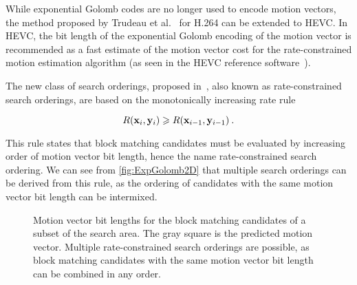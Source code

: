 \documentclass{article}
\newcommand{\beq}{\begin{dmath}}
\newcommand{\eeq}{\end{dmath}}
\newcommand{\vx}{\mathbf{x}}
\newcommand{\vy}{\mathbf{y}}
\begin{document}
While exponential Golomb codes are no longer used to encode motion vectors, the method proposed by Trudeau et al.~\cite{Trud14} for H.264 can be extended to HEVC. In HEVC, the bit length of the exponential Golomb encoding of the motion vector is recommended as a fast estimate of the motion vector cost for the rate-constrained motion estimation algorithm (as seen in the HEVC reference software~\cite{McCann2014}).

The new class of search orderings, proposed in~\cite{Trud14}, also known as rate-constrained search orderings, are based on the monotonically increasing rate rule

\beq
\small
R(\vx_i, \vy_i) \geqslant R(\vx_{i-1}, \vy_{i-1})\:.
\label{eq:SearchOrdering}
\eeq

This rule states that block matching candidates must be evaluated by increasing order of motion vector bit length, hence the name rate-constrained search ordering. We can see from \autoref{fig:ExpGolomb2D} that multiple search orderings can be derived from this rule, as the ordering of candidates with the same motion vector bit length can be intermixed. 

\begin{figure}[htb] \centering
{}
\caption{\small Motion vector bit lengths for the block matching candidates of a subset of the search area. The gray square is the predicted motion vector. Multiple rate-constrained search orderings are possible, as block matching candidates with the same motion vector bit length can be combined in any order.}
\label{fig:ExpGolomb2D}
\end{figure}
\end{document}
